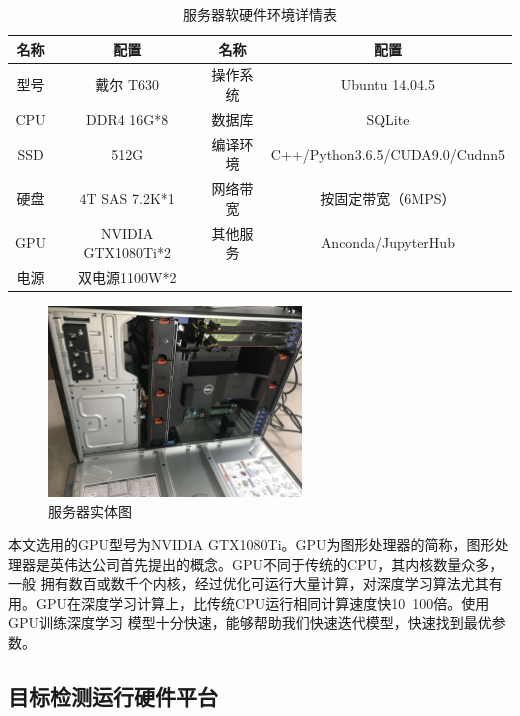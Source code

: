 {
    \begin{table}[htb] 
        \caption{服务器软硬件环境详情表}
        \label{table:server:config}
        \centering
        \begin{tabular}[t]{c|c|c|c}
            \hline
            名称 & 配置  & 名称 & 配置\\
            \hline
            型号 & 戴尔 T630 & 操作系统 & Ubuntu 14.04.5 \\
            \hline
            CPU & DDR4 16G*8 & 数据库 & SQLite\\
            \hline
            SSD & 512G & 编译环境 & C++/Python3.6.5/CUDA9.0/Cudnn5\\
            \hline
            硬盘 & 4T SAS 7.2K*1 & 网络带宽 & 按固定带宽（6MPS）\\
            \hline 
            GPU & NVIDIA GTX1080Ti*2 & 其他服务 & Anconda/JupyterHub\\
            \hline
            电源 & 双电源1100W*2 & & \\
            \hline
        \end{tabular} 
    \end{table}
}

\begin{figure}[h]
    \centering
    \includegraphics[width=0.6\textwidth]{pic/chap2/server.jpg}
    \caption{服务器实体图}
    \label{fig:server}
\end{figure}

本文选用的GPU型号为NVIDIA GTX1080Ti。GPU为图形处理器的简称，图形处理器是英伟达公司首先提出的概念。GPU不同于传统的CPU，其内核数量众多，一般
拥有数百或数千个内核，经过优化可运行大量计算，对深度学习算法尤其有用。GPU在深度学习计算上，比传统CPU运行相同计算速度快10~100倍。使用GPU训练深度学习
模型十分快速，能够帮助我们快速迭代模型，快速找到最优参数。

\subsection{目标检测运行硬件平台} 

